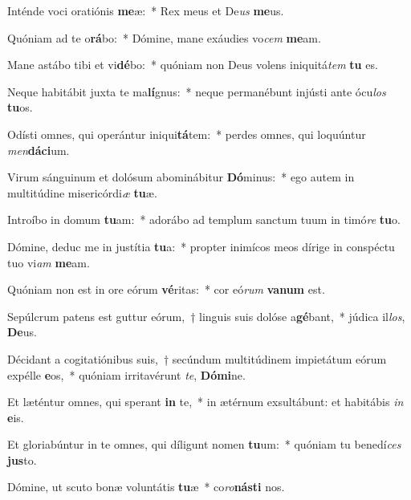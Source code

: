 \item Inténde voci oratiónis \textbf{me}æ:~* Rex meus et De\textit{us} \textbf{me}us.
\item Quóniam ad te o\textbf{rá}bo:~* Dómine, mane exáudies vo\textit{cem} \textbf{me}am.
\item Mane astábo tibi et vi\textbf{dé}bo:~* quóniam non Deus volens iniquitá\textit{tem} \textbf{tu} es.
\item Neque habitábit juxta te ma\textbf{lí}gnus:~* neque permanébunt injústi ante ócu\textit{los} \textbf{tu}os.
\item Odísti omnes, qui operántur iniqui\textbf{tá}tem:~* perdes omnes, qui loquúntur \textit{men}\textbf{dá}\textbf{ci}um.
\item Virum sánguinum et dolósum abominábitur \textbf{Dó}minus:~* ego autem in multitúdine misericórdi\textit{æ} \textbf{tu}æ.
\item Introíbo in domum \textbf{tu}am:~* adorábo ad templum sanctum tuum in timó\textit{re} \textbf{tu}o.
\item Dómine, deduc me in justítia \textbf{tu}a:~* propter inimícos meos dírige in conspéctu tuo vi\textit{am} \textbf{me}am.
\item Quóniam non est in ore eórum \textbf{vé}ritas:~* cor eó\textit{rum} \textbf{va}\textbf{num} est.
\item Sepúlcrum patens est guttur eórum,~† linguis suis dolóse a\textbf{gé}bant,~* júdica il\textit{los}, \textbf{De}us.
\item Décidant a cogitatiónibus suis,~† secúndum multitúdinem impietátum eórum expélle \textbf{e}os,~* quóniam irritavérunt \textit{te}, \textbf{Dó}\textbf{mi}ne.
\item Et læténtur omnes, qui sperant \textbf{in} te,~* in ætérnum exsultábunt: et habitábis \textit{in} \textbf{e}is.
\item Et gloriabúntur in te omnes, qui díligunt nomen \textbf{tu}um:~* quóniam tu benedí\textit{ces} \textbf{jus}to.
\item Dómine, ut scuto bonæ voluntátis \textbf{tu}æ~* co\textit{ro}\textbf{nás}\textbf{ti} nos.
